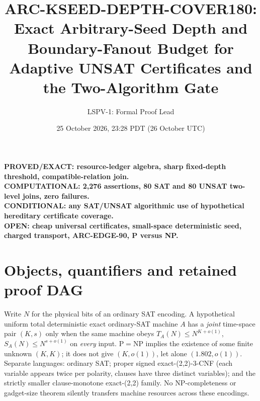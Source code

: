 \documentclass[11pt]{article}
\title{ARC-KSEED-DEPTH-COVER180:\\
\large Exact Arbitrary-Seed Depth and Boundary-Fanout Budget for\newline
Adaptive UNSAT Certificates and the Two-Algorithm Gate}
\author{LSPV-1: Formal Proof Lead}
\date{25 October 2026, 23:28 PDT (26 October UTC)}
\begin{document}
\maketitle
\begin{center}
\textbf{PROVED/EXACT: resource-ledger algebra, sharp fixed-depth threshold, compatible-relation join.}\\
\textbf{COMPUTATIONAL: 2,276 assertions, 80 SAT and 80 UNSAT two-level joins, zero failures.}\\
\textbf{CONDITIONAL: any SAT/UNSAT algorithmic use of hypothetical hereditary certificate coverage.}\\
\textbf{OPEN: cheap universal certificates, small-space deterministic seed, charged transport, ARC-EDGE-90, P versus NP.}
\end{center}

\section{Objects, quantifiers and retained proof DAG}
Write $N$ for the physical bits of an ordinary SAT encoding. A hypothetical
uniform total deterministic exact ordinary-SAT machine $A$ has a \emph{joint}
time-space pair $(K,s)$ only when the same machine obeys
$T_A(N)\le N^{K+o(1)}$, $S_A(N)\le N^{s+o(1)}$ on \emph{every} input.
$\mathrm{P}=\mathrm{NP}$ implies the existence of some finite unknown
$(K,K)$; it does not give $(K,o(1))$, let alone $(1.802,o(1))$.
Separate languages: ordinary SAT; proper signed exact-(2,2)-3-CNF (each
variable appears twice per polarity, clauses have three distinct variables);
and the strictly smaller clause-monotone exact-(2,2) family. No
NP-completeness or gadget-size theorem silently transfers machine resources
across these encodings.
\end{document}

